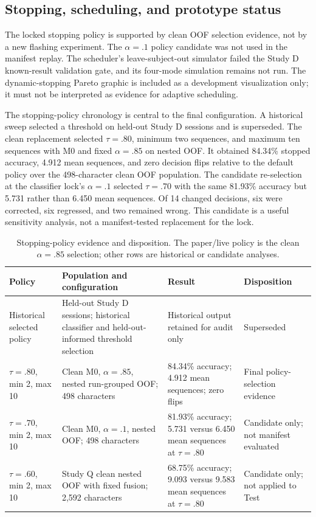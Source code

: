 \documentclass[final,5p,times,twocolumn,authoryear]{elsarticle}
\begin{document}
\subsection{Stopping, scheduling, and prototype status}
The locked stopping policy is supported by clean OOF selection evidence, not by a new flashing experiment. The $\alpha=.1$ policy candidate was not used in the manifest replay. The scheduler's leave-subject-out simulator failed the Study D known-result validation gate, and its four-mode simulation remains not run. The dynamic-stopping Pareto graphic is included as a development visualization only; it must not be interpreted as evidence for adaptive scheduling.

The stopping-policy chronology is central to the final configuration. A historical sweep selected a threshold on held-out Study D sessions and is superseded. The clean replacement selected $\tau=.80$, minimum two sequences, and maximum ten sequences with M0 and fixed $\alpha=.85$ on nested OOF. It obtained 84.34\% stopped accuracy, 4.912 mean sequences, and zero decision flips relative to the default policy over the 498-character clean OOF population. The candidate re-selection at the classifier lock's $\alpha=.1$ selected $\tau=.70$ with the same 81.93\% accuracy but 5.731 rather than 6.450 mean sequences. Of 14 changed decisions, six were corrected, six regressed, and two remained wrong. This candidate is a useful sensitivity analysis, not a manifest-tested replacement for the lock.

\begin{table}[t]
\centering\small
\caption{Stopping-policy evidence and disposition. The paper/live policy is the clean $\alpha=.85$ selection; other rows are historical or candidate analyses.}\label{tab:stopping-policy}
\begin{tabular}{p{}p{}p{}p{}}
\toprule
Policy & Population and configuration & Result & Disposition\\
\midrule
Historical selected policy & Held-out Study D sessions; historical classifier and held-out-informed threshold selection & Historical output retained for audit only & Superseded\\
$\tau=.80$, min 2, max 10 & Clean M0, $\alpha=.85$, nested run-grouped OOF; 498 characters & 84.34\% accuracy; 4.912 mean sequences; zero flips & Final policy-selection evidence\\
$\tau=.70$, min 2, max 10 & Clean M0, $\alpha=.1$, nested OOF; 498 characters & 81.93\% accuracy; 5.731 versus 6.450 mean sequences at $\tau=.80$ & Candidate only; not manifest evaluated\\
$\tau=.60$, min 2, max 10 & Study Q clean nested OOF with fixed fusion; 2,592 characters & 68.75\% accuracy; 9.093 versus 9.583 mean sequences at $\tau=.80$ & Candidate only; not applied to Test\\
\bottomrule
\end{tabular}
\end{table}
\end{document}
